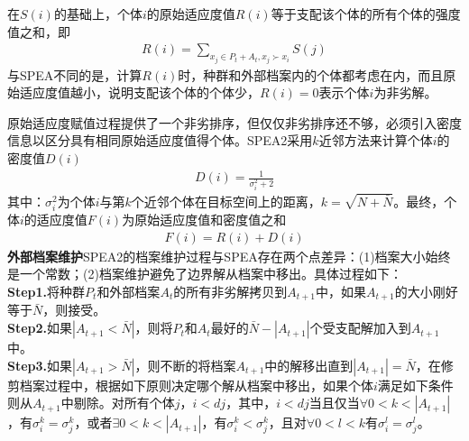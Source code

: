             在$S(i)$的基础上，个体$i$的原始适应度值$R(i)$等于支配该个体的所有个体的强度值之和，即
            \begin{align*}
            R(i) = \sum_{x_j\in P_t+A_t,x_j \succ x_i} S(j)
            \end{align*}
            与SPEA不同的是，计算$R(i)$时，种群和外部档案内的个体都考虑在内，而且原始适应度值越小，说明支配该个体的个体少，$R(i) = 0$表示个体$i$为非劣解。
            \par
            原始适应度赋值过程提供了一个非劣排序，但仅仅非劣排序还不够，必须引入密度信息以区分具有相同原始适应度值得个体。SPEA2采用$k$近邻方法来计算个体$i$的密度值$D(i)$
            \begin{align*}
            D(i) = \frac{1}{\sigma_i^2+2}
            \end{align*}
            其中：$\sigma_i^2$为个体$i$与第$k$个近邻个体在目标空间上的距离，$k = \sqrt{N+\bar{N}}$。最终，个体$i$的适应度值$F(i)$为原始适应度值和密度值之和
            \begin{align*}
            F(i) = R(i)+D(i)
            \end{align*}
            \textbf{外部档案维护}SPEA2的档案维护过程与SPEA存在两个点差异：(1)档案大小始终是一个常数；(2)档案维护避免了边界解从档案中移出。具体过程如下：\\
            \textbf{Step1.}将种群$P_t$和外部档案$A_t$的所有非劣解拷贝到$A_{t+1}$中，如果$A_{t+1}$的大小刚好等于$\bar{N}$，则接受。\\
            \textbf{Step2.}如果$|A_{t+1} < \bar{N}|$，则将$P_t$和$A_t$最好的$\bar{N} - |A_{t+1}|$个受支配解加入到$A_{t+1}$中。\\
            \textbf{Step3.}如果$|A_{t+1} > \bar{N}|$，则不断的将档案$A_{t+1}$中的解移出直到$|A_{t+1}| = \bar{N}$，在修剪档案过程中，根据如下原则决定哪个解从档案中移出，如果个体$i$满足如下条件则从$A_{t+1}$中剔除。对所有个体$j$，$i<dj$，其中，$i<dj$当且仅当$\forall 0<k<|A_{t+1}|$，有$\sigma_i^k = \sigma_j^k$，或者$\exists 0<k<|A_{t+1}|$，有$\sigma_i^k<\sigma_j^k$，且对$\forall 0<l<k$有$\sigma_i^l = \sigma_j^l$。

